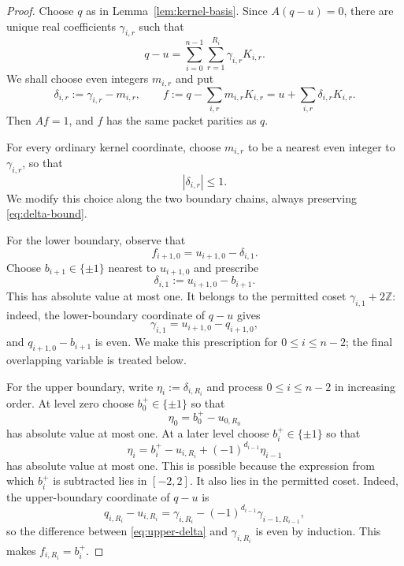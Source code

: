 \documentclass[11pt]{article}
\theoremstyle{definition}
\theoremstyle{remark}
\begin{document}
\begin{proof}
Choose $q$ as in Lemma~\ref{lem:kernel-basis}.  Since $A(q-u)=0$, there are unique real coefficients $\gamma_{i,r}$ such that
\[
 q-u=\sum_{i=0}^{n-1}\sum_{r=1}^{R_i}\gamma_{i,r}K_{i,r}.
\]
We shall choose even integers $m_{i,r}$ and put
\[
 \delta_{i,r}:=\gamma_{i,r}-m_{i,r},
 \qquad
 f:=q-\sum_{i,r}m_{i,r}K_{i,r}
   =u+\sum_{i,r}\delta_{i,r}K_{i,r}.
\]
Then $Af=1$, and $f$ has the same packet parities as $q$.

For every ordinary kernel coordinate, choose $m_{i,r}$ to be a nearest even integer to $\gamma_{i,r}$, so that
\begin{equation}\label{eq:delta-bound}
 |\delta_{i,r}|\le1.
\end{equation}
We modify this choice along the two boundary chains, always preserving \eqref{eq:delta-bound}.

For the lower boundary, observe that
\[
 f_{i+1,0}=u_{i+1,0}-\delta_{i,1}.
\]
Choose $b_{i+1}\in\{\pm1\}$ nearest to $u_{i+1,0}$ and prescribe
\begin{equation}\label{eq:lower-delta}
 \delta_{i,1}:=u_{i+1,0}-b_{i+1}.
\end{equation}
This has absolute value at most one.  It belongs to the permitted coset $\gamma_{i,1}+2\mathbb Z$: indeed, the lower-boundary coordinate of $q-u$ gives
\[
 \gamma_{i,1}=u_{i+1,0}-q_{i+1,0},
\]
and $q_{i+1,0}-b_{i+1}$ is even.  We make this prescription for $0\le i\le n-2$; the final overlapping variable is treated below.

For the upper boundary, write $\eta_i:=\delta_{i,R_i}$ and process $0\le i\le n-2$ in increasing order.  At level zero choose $b_0^+\in\{\pm1\}$ so that
\[
 \eta_0=b_0^+-u_{0,R_0}
\]
has absolute value at most one.  At a later level choose $b_i^+\in\{\pm1\}$ so that
\begin{equation}\label{eq:upper-delta}
 \eta_i=b_i^+-u_{i,R_i}+(-1)^{d_{i-1}}\eta_{i-1}
\end{equation}
has absolute value at most one.  This is possible because the expression from which $b_i^+$ is subtracted lies in $[-2,2]$.  It also lies in the permitted coset.  Indeed, the upper-boundary coordinate of $q-u$ is
\[
 q_{i,R_i}-u_{i,R_i}
 =\gamma_{i,R_i}-(-1)^{d_{i-1}}\gamma_{i-1,R_{i-1}},
\]
so the difference between \eqref{eq:upper-delta} and $\gamma_{i,R_i}$ is even by induction.  This makes $f_{i,R_i}=b_i^+$.


\end{proof}
\end{document}
